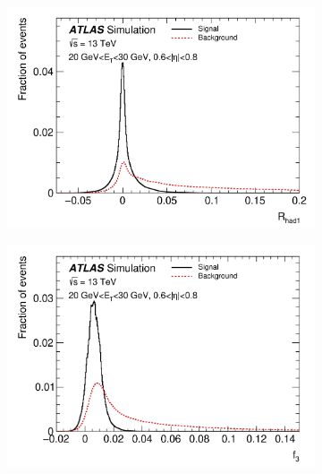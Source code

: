 \begin{figure}[h]
\centering
  \begin{subfigure}[b]{0.495\textwidth}
    \centering
    \includegraphics[width=1.0\textwidth]{figs/egamma/R_had1.png} 
    \label{fig:egamma:Rhad1}
  \end{subfigure}
  \hfill
  \begin{subfigure}[b]{0.495\textwidth}
    \centering
    \includegraphics[width=1.0\textwidth]{figs/egamma/f3.png} 
    \label{fig:egamma:f3}
  \end{subfigure}
  \hfill
  \begin{subfigure}[b]{0.495\textwidth}
    \centering

\end{subfigure}
\end{figure}

